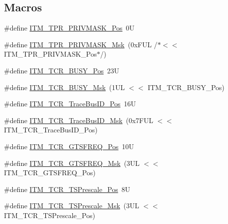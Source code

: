 \subsection*{Macros}
\begin{DoxyCompactItemize}
\item 
\#define \hyperlink{group___c_m_s_i_s___i_t_m_ga7abe5e590d1611599df87a1884a352e8}{I\-T\-M\-\_\-\-T\-P\-R\-\_\-\-P\-R\-I\-V\-M\-A\-S\-K\-\_\-\-Pos}~0\-U
\item 
\#define \hyperlink{group___c_m_s_i_s___i_t_m_ga168e089d882df325a387aab3a802a46b}{I\-T\-M\-\_\-\-T\-P\-R\-\_\-\-P\-R\-I\-V\-M\-A\-S\-K\-\_\-\-Msk}~(0x\-F\-U\-L /$\ast$$<$$<$ I\-T\-M\-\_\-\-T\-P\-R\-\_\-\-P\-R\-I\-V\-M\-A\-S\-K\-\_\-\-Pos$\ast$/)
\item 
\#define \hyperlink{group___c_m_s_i_s___i_t_m_ga9174ad4a36052c377cef4e6aba2ed484}{I\-T\-M\-\_\-\-T\-C\-R\-\_\-\-B\-U\-S\-Y\-\_\-\-Pos}~23\-U
\item 
\#define \hyperlink{group___c_m_s_i_s___i_t_m_ga43ad7cf33de12f2ef3a412d4f354c60f}{I\-T\-M\-\_\-\-T\-C\-R\-\_\-\-B\-U\-S\-Y\-\_\-\-Msk}~(1\-U\-L $<$$<$ I\-T\-M\-\_\-\-T\-C\-R\-\_\-\-B\-U\-S\-Y\-\_\-\-Pos)
\item 
\#define \hyperlink{group___c_m_s_i_s___i_t_m_gaca0281de867f33114aac0636f7ce65d3}{I\-T\-M\-\_\-\-T\-C\-R\-\_\-\-Trace\-Bus\-I\-D\-\_\-\-Pos}~16\-U
\item 
\#define \hyperlink{group___c_m_s_i_s___i_t_m_ga60c20bd9649d1da5a2be8e656ba19a60}{I\-T\-M\-\_\-\-T\-C\-R\-\_\-\-Trace\-Bus\-I\-D\-\_\-\-Msk}~(0x7\-F\-U\-L $<$$<$ I\-T\-M\-\_\-\-T\-C\-R\-\_\-\-Trace\-Bus\-I\-D\-\_\-\-Pos)
\item 
\#define \hyperlink{group___c_m_s_i_s___i_t_m_ga96c7c7cbc0d98426c408090b41f583f1}{I\-T\-M\-\_\-\-T\-C\-R\-\_\-\-G\-T\-S\-F\-R\-E\-Q\-\_\-\-Pos}~10\-U
\item 
\#define \hyperlink{group___c_m_s_i_s___i_t_m_gade862cf009827f7f6748fc44c541b067}{I\-T\-M\-\_\-\-T\-C\-R\-\_\-\-G\-T\-S\-F\-R\-E\-Q\-\_\-\-Msk}~(3\-U\-L $<$$<$ I\-T\-M\-\_\-\-T\-C\-R\-\_\-\-G\-T\-S\-F\-R\-E\-Q\-\_\-\-Pos)
\item 
\#define \hyperlink{group___c_m_s_i_s___i_t_m_gad7bc9ee1732032c6e0de035f0978e473}{I\-T\-M\-\_\-\-T\-C\-R\-\_\-\-T\-S\-Prescale\-\_\-\-Pos}~8\-U
\item 
\#define \hyperlink{group___c_m_s_i_s___i_t_m_ga7a723f71bfb0204c264d8dbe8cc7ae52}{I\-T\-M\-\_\-\-T\-C\-R\-\_\-\-T\-S\-Prescale\-\_\-\-Msk}~(3\-U\-L $<$$<$ I\-T\-M\-\_\-\-T\-C\-R\-\_\-\-T\-S\-Prescale\-\_\-\-Pos)
\item 

\end{DoxyCompactItemize}
